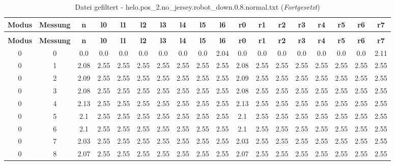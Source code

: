 \begin{landscape}
\begin{longtable}{|c|c||c||c|c|c|c|c|c|c||c|c|c|c|c|c|c|c|}
	\caption{Datei gefiltert - helo.pos\_2.no\_jersey.robot\_down.0.8.normal.txt} \label{tab:helo.pos-2.no-jersey.robot-down.0.8.normal.txt} \\ \hline
	\textbf{Modus} & \textbf{Messung} & \textbf{n} & \textbf{l0} & \textbf{l1} & \textbf{l2} & \textbf{l3} & \textbf{l4} & \textbf{l5} & \textbf{l6} & \textbf{r0} & \textbf{r1} & \textbf{r2} & \textbf{r3} & \textbf{r4} & \textbf{r5} & \textbf{r6} & \textbf{r7}\\ \hline
	\endfirsthead
	\caption[]{Datei gefiltert - helo.pos\_2.no\_jersey.robot\_down.0.8.normal.txt (\emph{Fortgesetzt})} \\ \hline
	\textbf{Modus} & \textbf{Messung} & \textbf{n} & \textbf{l0} & \textbf{l1} & \textbf{l2} & \textbf{l3} & \textbf{l4} & \textbf{l5} & \textbf{l6} & \textbf{r0} & \textbf{r1} & \textbf{r2} & \textbf{r3} & \textbf{r4} & \textbf{r5} & \textbf{r6} & \textbf{r7}\\ \hline
	\endhead
	0 & 0 & 0.0 & 0.0 & 0.0 & 0.0 & 0.0 & 0.0 & 0.0 & 2.04 & 0.0 & 0.0 & 0.0 & 0.0 & 0.0 & 0.0 & 0.0 & 2.11 \\ \hline
	0 & 1 & 2.08 & 2.55 & 2.55 & 2.55 & 2.55 & 2.55 & 2.55 & 2.55 & 2.08 & 2.55 & 2.55 & 2.55 & 2.55 & 2.55 & 2.55 & 2.55 \\ \hline
	0 & 2 & 2.09 & 2.55 & 2.55 & 2.55 & 2.55 & 2.55 & 2.55 & 2.55 & 2.09 & 2.55 & 2.55 & 2.55 & 2.55 & 2.55 & 2.55 & 2.55 \\ \hline
	0 & 3 & 2.08 & 2.55 & 2.55 & 2.55 & 2.55 & 2.55 & 2.55 & 2.55 & 2.08 & 2.55 & 2.55 & 2.55 & 2.55 & 2.55 & 2.55 & 2.55 \\ \hline
	0 & 4 & 2.13 & 2.55 & 2.55 & 2.55 & 2.55 & 2.55 & 2.55 & 2.55 & 2.13 & 2.55 & 2.55 & 2.55 & 2.55 & 2.55 & 2.55 & 2.55 \\ \hline
	0 & 5 & 2.1 & 2.55 & 2.55 & 2.55 & 2.55 & 2.55 & 2.55 & 2.55 & 2.1 & 2.55 & 2.55 & 2.55 & 2.55 & 2.55 & 2.55 & 2.55 \\ \hline
	0 & 6 & 2.1 & 2.55 & 2.55 & 2.55 & 2.55 & 2.55 & 2.55 & 2.55 & 2.1 & 2.55 & 2.55 & 2.55 & 2.55 & 2.55 & 2.55 & 2.55 \\ \hline
	0 & 7 & 2.03 & 2.55 & 2.55 & 2.55 & 2.55 & 2.55 & 2.55 & 2.55 & 2.03 & 2.55 & 2.55 & 2.55 & 2.55 & 2.55 & 2.55 & 2.55 \\ \hline
	0 & 8 & 2.07 & 2.55 & 2.55 & 2.55 & 2.55 & 2.55 & 2.55 & 2.55 & 2.07 & 2.55 & 2.55 & 2.55 & 2.55 & 2.55 & 2.55 & 2.55 \\ \hline

\end{longtable}
\end{landscape}
